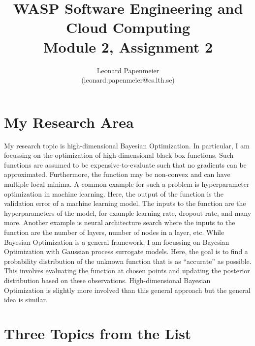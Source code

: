 \documentclass{article}
\title{WASP Software Engineering and Cloud Computing\\Module 2, Assignment 2}
\author{Leonard Papenmeier\\(leonard.papenmeier@cs.lth.se)}
\date{}
\begin{document}
    \maketitle
    
    \section{My Research Area}

    My research topic is high-dimensional Bayesian Optimization.
    In particular, I am focussing on the optimization of high-dimensional black box functions.
    Such functions are assumed to be expensive-to-evaluate such that no gradients can be approximated.
    Furthermore, the function may be non-convex and can have multiple local minima.
    A common example for such a problem is hyperparameter optimization in machine learning.
    Here, the output of the function is the validation error of a machine learning model.
    The inputs to the function are the hyperparameters of the model, for example learning rate, dropout rate, and many more.
    Another example is neural architecture search where the inputs to the function are the number of layers, number of nodes in a layer, etc.
    While Bayesian Optimization is a general framework, I am focussing on Bayesian Optimization with Gaussian process surrogate models.
    Here, the goal is to find a probability distribution of the unknown function that is as ``accurate'' as possible.
    This involves evaluating the function at chosen points and updating the posterior distribution based on these observations.
    High-dimensional Bayesian Optimization is slightly more involved than this general approach but the general idea is similar.

    \section{Three Topics from the List}
\end{document}
